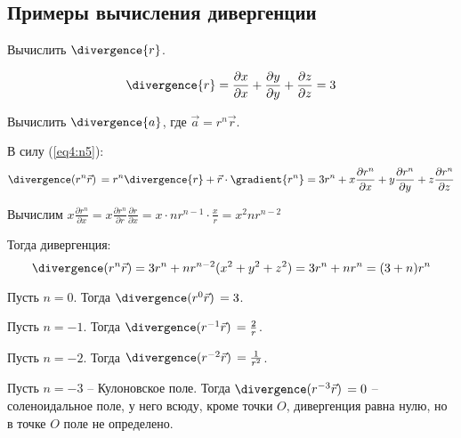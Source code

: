 \subsection{Примеры вычисления дивергенции}

	\begin{example}
	Вычислить \( \divergence{r} \).
	\end{example}
	\begin{solution}
	\[ \divergence{r} = \frac{\partial x}{\partial x} + \frac{\partial y}{\partial y} + \frac{\partial z}{\partial z} = 3 \]
	\end{solution}
	
	\begin{example}
	Вычислить \( \divergence{a} \), где \( \vec{a} = r^n\vec{r} \).
	\end{example}
	\begin{solution}
	В силу (\ref{eq4:n5}):
	\[ \divergence(r^n\vec{r})\, = r^n\divergence{r} + \vec{r}\cdot\gradient{r^n} = 3r^n + x\frac{\partial r^n}{\partial x} + y\frac{\partial r^n}{\partial y} + z\frac{\partial r^n}{\partial z} \]
	
	Вычислим \( x\frac{\partial r^n}{\partial x} = x\frac{\partial r^n}{\partial r}\frac{\partial r}{\partial x} = x\cdot nr^{n-1}\cdot\frac{x}{r} = x^2nr^{n-2} \)
	
	Тогда дивергенция:
	\[ \divergence(r^n\vec{r}) = 3r^n + nr^{n-2}(x^2 + y^2 + z^2) = 3r^n + nr^n = (3 + n)r^n \]
	
	Пусть \( n = 0 \). Тогда \( \divergence(r^0\vec{r})\, = 3 \).
	
	Пусть \( n = -1 \). Тогда \( \divergence(r^{-1}\vec{r})\, = \frac{2}{r} \).
	
	Пусть \( n = -2 \). Тогда \( \divergence(r^{-2}\vec{r})\, = \frac{1}{r^2} \).
	
	Пусть \( n = -3 \) -- Кулоновское поле. Тогда \( \divergence(r^{-3}\vec{r})\, = 0 \) -- соленоидальное поле, у него всюду, кроме точки \( O \), дивергенция равна нулю, но в точке \( O \) поле не определено.
	\end{solution}
	
